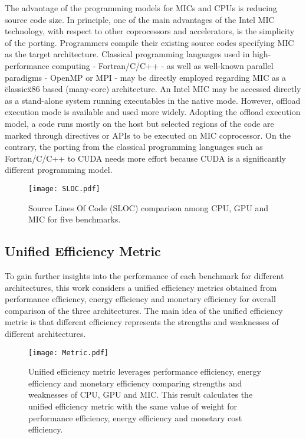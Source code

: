  The advantage of the programming models for MICs and CPUs is reducing source code size. In principle, one of the main advantages of the Intel MIC technology, with respect to other coprocessors and accelerators, is the simplicity of the porting. Programmers compile their existing source codes specifying MIC as the target architecture. Classical programming languages used in high-performance computing - Fortran/C/C++ - as well as well-known parallel paradigms - OpenMP or MPI - may be directly employed regarding MIC as a \"classic\" x86 based (many-core) architecture. An Intel MIC may be accessed directly as a stand-alone system running executables in the native mode. However, offload execution mode is available and used more widely. Adopting the offload execution model, a code runs mostly on the host but selected regions of the code are marked through directives or APIs to be executed on MIC coprocessor. On the contrary, the porting from the classical programming languages such as Fortran/C/C++ to CUDA needs more effort because CUDA is a significantly different programming model.

  
    \begin{figure}[h!]
  \centering
  \begin{minipage}{0.5\textwidth}
    \centering
   \centering
     \texttt{[image: SLOC.pdf]}    
  \caption{Source Lines Of Code (SLOC) comparison among CPU, GPU and MIC for five benchmarks.}
  \label{fig:sloc}
\end{minipage}%
\end{figure}

\subsection{Unified Efficiency Metric}

To gain further insights into the performance of each benchmark for different architectures, this work considers a unified efficiency metrics obtained from performance efficiency, energy efficiency and monetary efficiency for overall comparison of the three architectures. The main idea of the unified efficiency metric is that different efficiency represents the strengths and weaknesses of different architectures.

    \begin{figure}[h!]
  \centering
  \begin{minipage}{0.5\textwidth}
    \centering
   \centering
     \texttt{[image: Metric.pdf]}    
  \caption{Unified efficiency metric leverages performance efficiency, energy efficiency and monetary efficiency comparing strengths and weaknesses of CPU, GPU and MIC. This result calculates the unified efficiency metric with the same value of weight for performance efficiency, energy efficiency and monetary cost efficiency.}
  \label{fig:metric}
\end{minipage}%
\end{figure}

